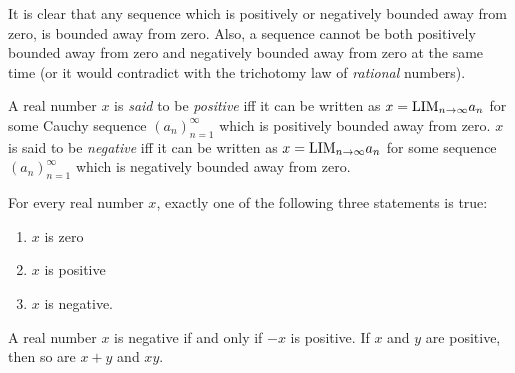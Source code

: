 \begin{note}
It is clear that any sequence which is positively or negatively bounded away from zero, is bounded away from zero.
Also, a sequence cannot be both positively bounded away from zero and negatively bounded away from zero at the same time
(or it would contradict with the trichotomy law of \emph{rational} numbers).
\end{note}

\begin{definition} \label{def 5.4.3}
A real number \(x\) is \emph{said} to be \emph{positive} iff it can be written as \(x = \text{LIM}_{n \to \infty} a_n\) for some Cauchy sequence \((a_n)_{n = 1}^{\infty}\) which is positively bounded away from zero.
\(x\) is said to be \emph{negative} iff it can be written as \(x = \text{LIM}_{n \to \infty} a_n\) for some sequence \((a_n)_{n = 1}^{\infty}\) which is negatively bounded away from zero.
\end{definition}

\begin{proposition}  \label{prop 5.4.4}
For every real number \(x\), exactly one of the following three statements is true:
\begin{enumerate}
    \item \(x\) is zero
    \item \(x\) is positive
    \item \(x\) is negative.
\end{enumerate}
A real number \(x\) is negative if and only if \(-x\) is positive. 
If \(x\) and \(y\) are positive, then so are \(x + y\) and \(xy\).
\end{proposition}

